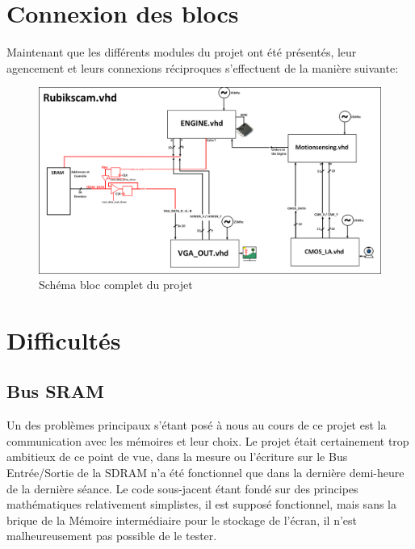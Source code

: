 \documentclass[10pt,a4paper]{report}
\begin{document}
\chapter{Connexion des blocs}

Maintenant que les différents modules du projet ont été présentés, leur agencement et leurs connexions réciproques s'effectuent de la manière suivante:

\begin{landscape}

\begin{figure}[!h]
\centering
\includegraphics[width=590pt]{gfx/whole.png}
\caption{Schéma bloc complet du projet}
\end{figure}

\end{landscape}

\chapter{Difficultés}

\section{Bus SRAM}
Un des problèmes principaux s'étant posé à nous au cours de ce projet est la communication avec les mémoires et leur choix. Le projet était certainement trop ambitieux de ce point de vue, dans la mesure ou l'écriture sur le Bus Entrée/Sortie de la SDRAM n'a été fonctionnel que dans la dernière demi-heure de la dernière séance. Le code sous-jacent étant fondé sur des principes mathématiques relativement simplistes, il est supposé fonctionnel, mais sans la brique de la Mémoire intermédiaire pour le stockage de l'écran, il n'est malheureusement pas possible de le tester.
\end{document}

